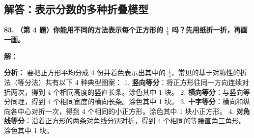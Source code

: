 \newpage

\newpage

\subsection{解答：表示分数的多种折叠模型}

\vspace{0.6cm}

\textbf{\LARGE 83.} \textbf{（第 4 题）你能用不同的方法表示每个正方形的 $\displaystyle\frac{1}{4}$ 吗？先用纸折一折，再画一画。}

\vspace{0.4cm}
\textbf{解：}

\textbf{分析：}
要把正方形平均分成 $4$ 份并着色表示出其中的 $\displaystyle\frac{1}{4}$，常见的基于对称性的折法（等分法）共有以下 4 种典型图案：
1. \textbf{竖向等分}：将正方形往同一方向连续对折两次，得到 4 个相同高度的竖直长条。涂色其中 1 块。
2. \textbf{横向等分}：与竖向等分同理，得到 4 个相同宽度的横向长条。涂色其中 1 块。
3. \textbf{十字等分}：横向和纵向各中心对折一次，得到 4 个相同的小正方形。涂色其中 1 块小正方形。
4. \textbf{对角线等分}：沿着正方形的两条对角线分别对折，得到 4 个相同的等腰直角三角形。涂色其中 1 块。

